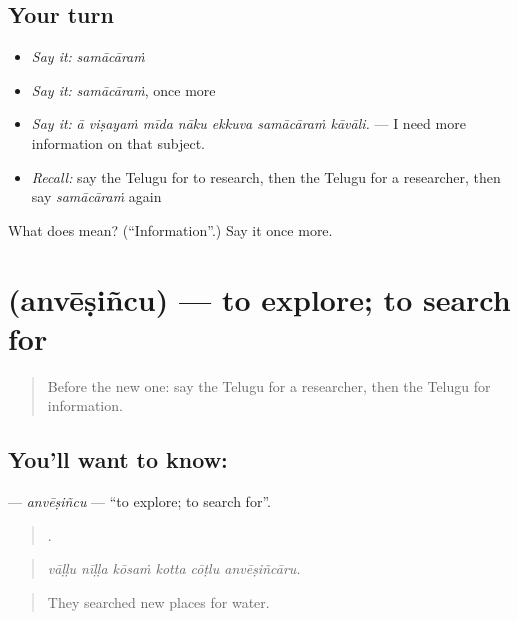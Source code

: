 \subsection*{Your turn}
\begin{itemize}
\raggedright
  \item \emph{Say it:} \emph{samācāraṁ}
  \item \emph{Say it:} \emph{samācāraṁ}, once more
  \item \emph{Say it:} \emph{ā viṣayaṁ mīda nāku ekkuva samācāraṁ kāvāli.} — I need more information on that subject.
  \item \emph{Recall:} say the Telugu for to research, then the Telugu for a researcher, then say \emph{samācāraṁ} again
\end{itemize}

\begin{tcolorbox}[breakable,colback=teal!4,colframe=teal!35!black,title={Before you move on}]
What does  mean? (\textquotedblleft{}Information\textquotedblright{}.) Say it once more.
\end{tcolorbox}
\section[\texorpdfstring{\te{అన్వేషించు} (anvēṣiñcu)}{అన్వేషించు (anvēṣiñcu)}]{ (anvēṣiñcu) — to explore; to search for}

\label{lesson:TE-C412-anvesincu}



\begin{quote}
Before the new one: say the Telugu for a researcher, then the Telugu for information.
\end{quote}

\subsection*{You'll want to know: }
\textbf{} — \emph{anvēṣiñcu} — \textquotedblleft{}to explore; to search for\textquotedblright{}.

\begin{quote}
     .
\end{quote}

\begin{quote}
\emph{vāḷḷu nīḷḷa kōsaṁ kotta cōṭlu anvēṣiñcāru.}
\end{quote}

\begin{quote}
They searched new places for water.
\end{quote}

